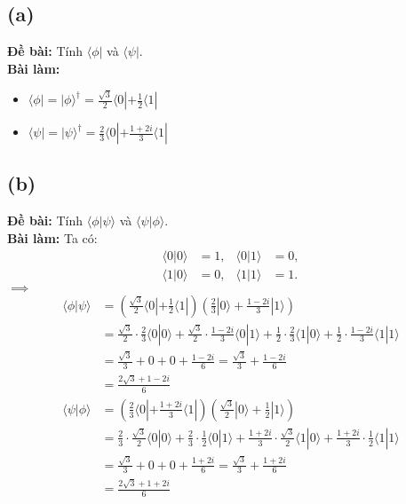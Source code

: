 \subsection{(a)}
\textbf{Đề bài:} Tính $\langle\phi|$ và $\langle\psi|$.\\
\textbf{Bài làm:}
\begin{itemize}
    \item $\langle\phi| = |\phi\rangle^\dagger = \frac{\sqrt{3}}{2}\langle0|+\frac{1}{2}\langle1|$
    \item $\langle\psi| = |\psi\rangle^\dagger = \frac{2}{3}\langle0|+\frac{1+2i}{3}\langle1|$
\end{itemize}

\subsection{(b)}
\textbf{Đề bài:} Tính $\langle\phi|\psi\rangle$ và $\langle\psi|\phi\rangle$.\\
\textbf{Bài làm:}
Ta có:
\begin{align*}
    \langle0|0\rangle & = 1, & \langle0|1\rangle & = 0, \\
    \langle1|0\rangle & = 0, & \langle1|1\rangle & = 1.
\end{align*}
$\implies$
\begin{align*}
    \langle\phi|\psi\rangle & = \left(\frac{\sqrt{3}}{2}\langle0|+\frac{1}{2}\langle1|\right)\left(\frac{2}{3}|0\rangle+\frac{1-2i}{3}|1\rangle\right)                                                                                        \\
                            & = \frac{\sqrt{3}}{2}\cdot\frac{2}{3}\langle0|0\rangle + \frac{\sqrt{3}}{2}\cdot\frac{1-2i}{3}\langle0|1\rangle + \frac{1}{2}\cdot\frac{2}{3}\langle1|0\rangle + \frac{1}{2}\cdot\frac{1-2i}{3}\langle1|1\rangle \\
                            & = \frac{\sqrt{3}}{3} + 0 + 0 + \frac{1-2i}{6} = \frac{\sqrt{3}}{3} + \frac{1-2i}{6}                                                                                                                             \\
                            & = \frac{2\sqrt{3} + 1 - 2i}{6}
\end{align*}
\begin{align*}
    \langle\psi|\phi\rangle & = \left(\frac{2}{3}\langle0|+\frac{1+2i}{3}\langle1|\right)\left(\frac{\sqrt{3}}{2}|0\rangle+\frac{1}{2}|1\rangle\right)                                                                                        \\
                            & = \frac{2}{3}\cdot\frac{\sqrt{3}}{2}\langle0|0\rangle + \frac{2}{3}\cdot\frac{1}{2}\langle0|1\rangle + \frac{1+2i}{3}\cdot\frac{\sqrt{3}}{2}\langle1|0\rangle + \frac{1+2i}{3}\cdot\frac{1}{2}\langle1|1\rangle \\
                            & = \frac{\sqrt{3}}{3} + 0 + 0 + \frac{1+2i}{6} = \frac{\sqrt{3}}{3} + \frac{1+2i}{6}                                                                                                                             \\
                            & = \frac{2\sqrt{3} + 1 + 2i}{6}
\end{align*}

